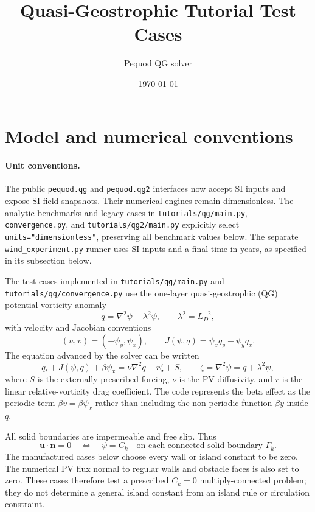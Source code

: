 \documentclass[11pt]{article}
\title{Quasi-Geostrophic Tutorial Test Cases}
\author{Pequod QG solver}
\date{\today}
\newcommand{\lap}{\nabla^2}
\begin{document}
\maketitle

\section{Model and numerical conventions}

\paragraph{Unit conventions.}
The public \texttt{pequod.qg} and \texttt{pequod.qg2} interfaces now accept
SI inputs and expose SI field snapshots. Their numerical engines remain
dimensionless. The analytic benchmarks and legacy cases in
\texttt{tutorials/qg/main.py}, \texttt{convergence.py}, and
\texttt{tutorials/qg2/main.py} explicitly select
\texttt{units="dimensionless"}, preserving all benchmark values below.
The separate \texttt{wind\_experiment.py} runner uses SI inputs and a
final time in years, as specified in its subsection below.

The test cases implemented in \texttt{tutorials/qg/main.py} and
\texttt{tutorials/qg/convergence.py} use the one-layer
quasi-geostrophic (QG) potential-vorticity anomaly
\begin{equation}
  q = \lap\psi - \lambda^2\psi,
  \qquad
  \lambda^2 = L_D^{-2},
  \label{eq:pv}
\end{equation}
with velocity and Jacobian conventions
\begin{equation}
  (u,v)=(-\psi_y,\psi_x),
  \qquad
  J(\psi,q)=\psi_xq_y-\psi_yq_x.
  \label{eq:velocity-jacobian}
\end{equation}
The equation advanced by the solver can be written
\begin{equation}
  q_t + J(\psi,q) + \beta\psi_x
  = \nu\lap q-r\zeta+S,
  \qquad
  \zeta=\lap\psi=q+\lambda^2\psi,
  \label{eq:qg}
\end{equation}
where $S$ is the externally prescribed forcing, $\nu$ is the PV
diffusivity, and $r$ is the linear relative-vorticity drag coefficient.
The code represents the beta effect as the periodic term $\beta v=
\beta\psi_x$ rather than including the non-periodic function $\beta y$
inside $q$.

All solid boundaries are impermeable and free slip.  Thus
\begin{equation}
  \boldsymbol{u}\mathbin{\cdot}\boldsymbol{n}=0
  \quad\Longleftrightarrow\quad
  \psi=C_k
  \quad\text{on each connected solid boundary }\Gamma_k.
  \label{eq:solid-bc}
\end{equation}
The manufactured cases below choose every wall or island constant to be
zero.  The numerical PV flux normal to regular walls and obstacle faces is
also set to zero.  These cases therefore test a prescribed $C_k=0$
multiply-connected problem; they do not determine a general island
constant from an island rule or circulation constraint.
\end{document}
